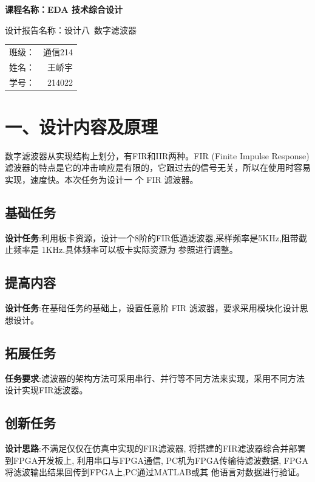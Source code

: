 \documentclass{article}
\newcommand{\fourhao}{\fontsize{14pt}{\baselineskip}\selectfont} %
\newcommand{\xiaosihao}{\fontsize{12pt}{\baselineskip}\selectfont} %
\begin{document}
\begin{titlepage}
    \centering
    \vspace*{2cm}

    \Huge
    \textbf{课程名称：EDA 技术综合设计}

    \vspace{2cm}

    \LARGE
    设计报告名称：设计八\ 数字滤波器

    \vspace{4cm}

    \centering
    \Large
    \begin{tabular}{rl}
        班级： & 通信214    \\
        姓名： & \ 王峤宇    \\
        学号： & \ 214022
    \end{tabular}

    \vfill

    \vspace{1cm}
\end{titlepage}

\newpage
\section*{\fourhao 一、设计内容及原理}
\xiaosihao
{}
数字滤波器从实现结构上划分，有FIR和IIR两种。FIR (Finite Impulse Response)滤波器的特点是它的冲击响应是有限的，它跟过去的信号无关，所以在使用时容易实现，速度快。本次任务为设计一
个 FIR 滤波器。
\subsection*{基础任务}
\textbf{设计任务}:利用板卡资源，设计一个8阶的FIR低通滤波器,采样频率是5KHz,阻带截止频率是 1KHz.具体频率可以板卡实际资源为
参照进行调整。
\subsection*{提高内容}
\textbf{设计任务}:在基础任务的基础上，设置任意阶 FIR 滤波器，要求采用模块化设计思想设计。
\subsection*{拓展任务}
\textbf{任务要求}:滤波器的架构方法可采用串行、并行等不同方法来实现，采用不同方法设计实现FIR滤波器。
\subsection*{创新任务}
\textbf{设计思路}:不满足仅仅在仿真中实现的FIR滤波器, 将搭建的FIR滤波器综合并部署到FPGA开发板上, 
利用串口与FPGA通信, PC机为FPGA传输待滤波数据, FPGA将滤波输出结果回传到FPGA上,PC通过MATLAB或其
他语言对数据进行验证。\\
\end{document}
